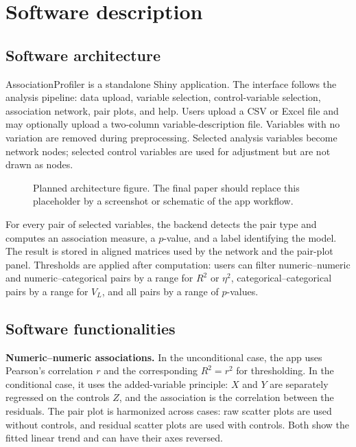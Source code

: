 \documentclass[preprint,12pt,a4paper]{elsarticle}
\numberwithin{equation}{section}
\begin{document}
\section{Software description}

\subsection{Software architecture}

AssociationProfiler is a standalone Shiny application. The interface follows the analysis pipeline: data upload, variable selection, control-variable selection, association network, pair plots, and help. Users upload a CSV or Excel file and may optionally upload a two-column variable-description file. Variables with no variation are removed during preprocessing. Selected analysis variables become network nodes; selected control variables are used for adjustment but are not drawn as nodes.

\begin{figure}[!ht]
\centering
{}
\caption{Planned architecture figure. The final paper should replace this placeholder by a screenshot or schematic of the app workflow.}
\label{fig:workflow}
\end{figure}

For every pair of selected variables, the backend detects the pair type and computes an association measure, a $p$-value, and a label identifying the model. The result is stored in aligned matrices used by the network and the pair-plot panel. Thresholds are applied after computation: users can filter numeric--numeric and numeric--categorical pairs by a range for $R^2$ or $\eta^2$, categorical--categorical pairs by a range for $V_L$, and all pairs by a range of $p$-values.

\subsection{Software functionalities}

\textbf{Numeric--numeric associations.} In the unconditional case, the app uses Pearson's correlation $r$ and the corresponding $R^2=r^2$ for thresholding. In the conditional case, it uses the added-variable principle: $X$ and $Y$ are separately regressed on the controls $Z$, and the association is the correlation between the residuals. The pair plot is harmonized across cases: raw scatter plots are used without controls, and residual scatter plots are used with controls. Both show the fitted linear trend and can have their axes reversed.
\end{document}
